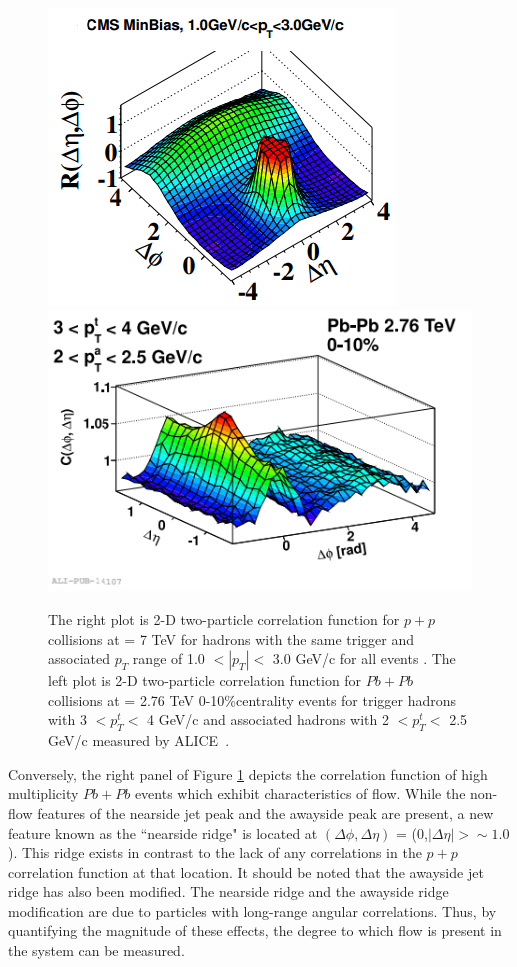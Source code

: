 \begin{figure}[!ht]
\begin{center}
\includegraphics[width=0.43\linewidth]{figs/pp_correlation_function_min_bias.png}
\includegraphics[width=0.48\linewidth]{figs/pbpb_correlation_function_010.png}
\caption{The right plot is 2-D two-particle correlation function for $p+p$ collisions at \sqsn = 7 TeV for hadrons with the same trigger and associated $p_T$ range of 1.0 $<|p_T|<$ 3.0 GeV/c for all events \cite{Khachatryan2010}. The left plot is 2-D two-particle correlation function for $Pb+Pb$ collisions at \sqsn = 2.76 TeV 0-10\%centrality events for trigger hadrons with 3 $<p_T^t<$ 4 GeV/c and associated hadrons with 2 $<p_T^t<$ 2.5 GeV/c measured by ALICE~\cite{Khachatryan2010}.}
\label{fig:corr_function_example}
\end{center}
\end{figure}

Conversely, the right panel of Figure \ref{fig:corr_function_example} depicts the correlation function of high multiplicity $Pb+Pb$ events which exhibit characteristics of flow. 
While the non-flow features of the nearside jet peak and the awayside peak are present, a new feature known as the ``nearside ridge" is located at $(\Delta\phi,\Delta\eta)$ = (0,$|\Delta\eta|> \sim1.0$). This ridge exists in contrast to the lack of any correlations in the $p+p$ correlation function at that location. It should be noted that the awayside jet ridge has also been modified. The nearside ridge and the awayside ridge modification are due to particles with long-range angular correlations. Thus, by quantifying the magnitude of these effects, the degree to which flow is present in the system can be measured.

